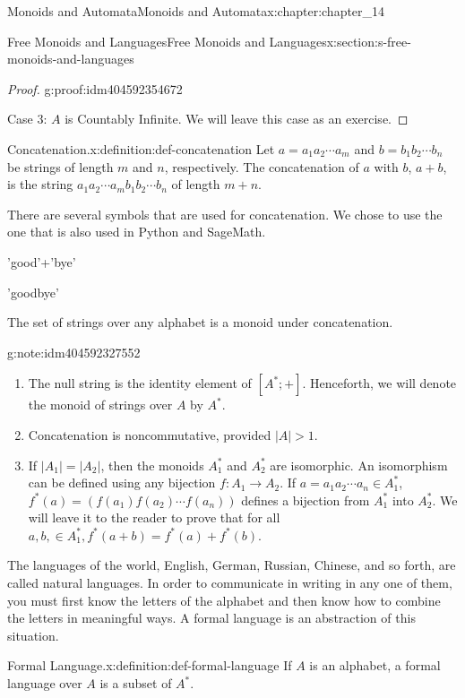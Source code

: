 \documentclass[twoside,10pt,]{book}
\numberwithin{equation}{section}
\begin{document}
\begin{chapterptx}{Monoids and Automata}{}{Monoids and Automata}{}{}{x:chapter:chapter_14}
\begin{sectionptx}{Free Monoids and Languages}{}{Free Monoids and Languages}{}{}{x:section:s-free-monoids-and-languages}
\begin{proof}{}{g:proof:idm404592354672}
\par
Case 3: \(A\) is Countably Infinite. We will leave this case as an exercise.%
\end{proof}
\begin{definition}{Concatenation.}{x:definition:def-concatenation}%
%
\label{g:notation:idm404592335136}%
Let  \(a=a_1a_2\cdots  a_m\) and \(b=b_1b_2\cdots  b_n\) be strings of length \(m\) and \(n\), respectively. The concatenation of \(a\) with \(b\), \(a+b\), is the string \(a_1a_2\cdots  a_mb_1b_2\cdots  b_n\) of length  \(m+n\).%
\end{definition}
There are several symbols that are used for concatenation.  We chose to use the one that is also used in Python and SageMath.%
\begin{sageinput}
'good'+'bye'
\end{sageinput}
\begin{sageoutput}
'goodbye'
\end{sageoutput}
The set of strings over any alphabet is a monoid under concatenation.%
\begin{note}{}{g:note:idm404592327552}%
%
\begin{enumerate}[label=(\alph*)]
\item{}The null string is the identity element of \([A^*; +]\). Henceforth, we will denote the monoid of strings over \(A\) by \(A^*\).%
\item{}Concatenation is noncommutative, provided \(\lvert A\rvert  > 1\).%
\item{}If \(\lvert A_1 \rvert  = \lvert A_2 \rvert\), then the monoids \(A_1^*\) and \(A_2^*\) are isomorphic. An isomorphism can be defined using any bijection \(f:A_1\to A_2\). If \(a=a_1a_2\cdots  a_n \in  A_1^*\), \(f^*(a)=(f(a_1)f(a_2)\cdots  f(a_n))\) defines a bijection from \(A_1^*\) into \(A_2^*\). We will leave it to the reader to prove that for all \(a,b,\in A_1^*,f^*(a+b)=f^*(a)+f^*(b)\).%
\end{enumerate}
%
\end{note}
The languages of the world, English, German, Russian, Chinese, and so forth, are called natural languages. In order to communicate in writing in any one of them, you must first know the letters of the alphabet and then know how to combine the letters in meaningful ways. A  formal language is an abstraction of this situation.%
\begin{definition}{Formal Language.}{x:definition:def-formal-language}%
%
If \(A\) is an alphabet, a formal language over \(A\) is a subset of \(A^*\).%

\end{definition}
\end{sectionptx}
\end{chapterptx}
\end{document}

